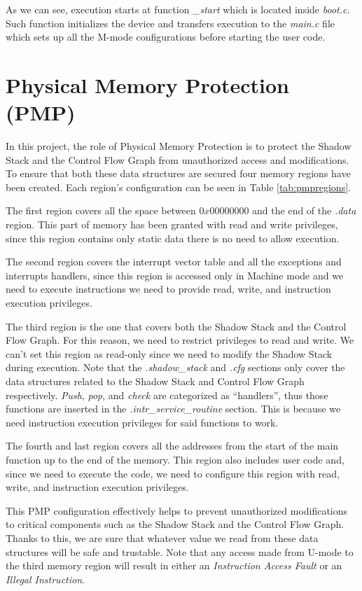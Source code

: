As we can see, execution starts at function \textit{\_start} which is located
inside \textit{boot.c}. Such function initializes the device and transfers
execution to the \textit{main.c} file which sets up all the M-mode configurations
before starting the user code.

\section{Physical Memory Protection (PMP)}
\label{sec:project_pmp}

In this project, the role of Physical Memory Protection is to protect the Shadow
Stack and the Control Flow Graph from unauthorized access and modifications. To
ensure that both these data structures are secured four memory regions have been
created. Each region's configuration can be seen in Table \ref{tab:pmpregions}.

The first region covers all the space between $0x00000000$ and the end of the \textit{.data}
region. This part of memory has been granted with read and write privileges,
since this region contains only static data there is no need to allow execution.

The second region covers the interrupt vector table and all the exceptions and
interrupts handlers, since this region is accessed only in Machine mode and we need
to execute instructions we need to provide read, write, and instruction execution
privileges.

The third region is the one that covers both the Shadow Stack and the Control Flow
Graph. For this reason, we need to restrict privileges to read and write. We can't
set this region as read-only since we need to modify the Shadow Stack during
execution. Note that the \textit{.shadow\_stack} and \textit{.cfg} sections only
cover the data structures related to the Shadow Stack and Control Flow Graph respectively.
\textit{Push}, \textit{pop}, and \textit{check} are categorized as ``handlers'',
thus those functions are inserted in the \textit{.intr\_service\_routine} section.
This is because we need instruction execution privileges for said functions to
work.

The fourth and last region covers all the addresses from the start of the main
function up to the end of the memory. This region also includes user code and,
since we need to execute the code, we need to configure this region with read,
write, and instruction execution privileges.

This PMP configuration effectively helps to prevent unauthorized modifications to
critical components such as the Shadow Stack and the Control Flow Graph. Thanks
to this, we are sure that whatever value we read from these data structures will
be safe and trustable. Note that any access made from U-mode to the third memory
region will result in either an \textit{Instruction Access Fault} or an \textit{Illegal
Instruction}.


